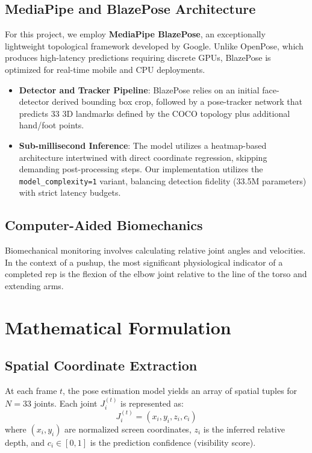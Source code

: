 \documentclass[12pt, a4paper]{article}
\begin{document}
\subsection{MediaPipe and BlazePose Architecture}
For this project, we employ \textbf{MediaPipe BlazePose}, an exceptionally lightweight topological framework developed by Google. Unlike OpenPose, which produces high-latency predictions requiring discrete GPUs, BlazePose is optimized for real-time mobile and CPU deployments.
\begin{itemize}
    \item \textbf{Detector and Tracker Pipeline}: BlazePose relies on an initial face-detector derived bounding box crop, followed by a pose-tracker network that predicts 33 3D landmarks defined by the COCO topology plus additional hand/foot points.
    \item \textbf{Sub-millisecond Inference}: The model utilizes a heatmap-based architecture intertwined with direct coordinate regression, skipping demanding post-processing steps. Our implementation utilizes the \texttt{model\_complexity=1} variant, balancing detection fidelity (33.5M parameters) with strict latency budgets.
\end{itemize}

\subsection{Computer-Aided Biomechanics}
Biomechanical monitoring involves calculating relative joint angles and velocities. In the context of a pushup, the most significant physiological indicator of a completed rep is the flexion of the elbow joint relative to the line of the torso and extending arms. 


\section{Mathematical Formulation}

\subsection{Spatial Coordinate Extraction}
At each frame $t$, the pose estimation model yields an array of spatial tuples for $N = 33$ joints. Each joint $J_i^{(t)}$ is represented as:
\begin{equation}
J_i^{(t)} = (x_i, y_i, z_i, c_i)
\end{equation}
where $(x_i, y_i)$ are normalized screen coordinates, $z_i$ is the inferred relative depth, and $c_i \in [0, 1]$ is the prediction confidence (visibility score).
\end{document}
